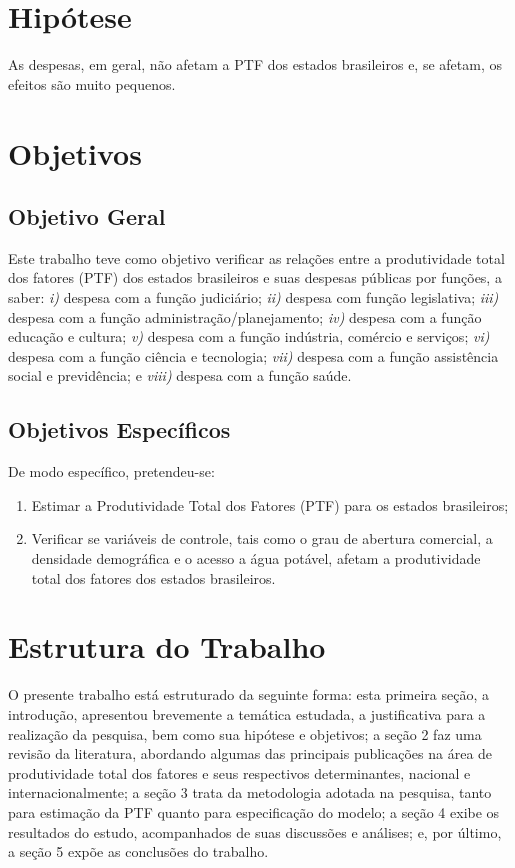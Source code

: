 \documentclass[
  12pt,
  a4paper,
  oneside,
  brazil,
  chapter=TITLE,
  section=TITLE
]{abntex2}
\begin{document}
\section{Hipótese}

As despesas, em geral, não afetam a PTF dos estados brasileiros e, se afetam, os efeitos são muito pequenos.

\section{Objetivos}

\subsection{Objetivo Geral}

Este trabalho teve como objetivo verificar as relações entre a produtividade total dos fatores (PTF) dos estados brasileiros e suas despesas públicas por funções, a saber: \textit{i)} despesa com a função judiciário; \textit{ii)} despesa com função legislativa; \textit{iii)} despesa com a função administração/planejamento; \textit{iv)} despesa com a função educação e cultura; \textit{v)} despesa com a função indústria, comércio e serviços; \textit{vi)} despesa com a função ciência e tecnologia; \textit{vii)} despesa com a função assistência social e previdência; e \textit{viii)} despesa com a função saúde.

\subsection{Objetivos Específicos}

De modo específico, pretendeu-se:

\begin{enumerate}[label=\alph*)]
  \item Estimar a Produtividade Total dos Fatores (PTF) para os estados brasileiros;
  \item Verificar se variáveis de controle, tais como o grau de abertura comercial, a densidade demográfica e o acesso a água potável, afetam a produtividade total dos fatores dos estados brasileiros.
\end{enumerate}

\section{Estrutura do Trabalho}

O presente trabalho está estruturado da seguinte forma: esta primeira seção, a introdução, apresentou brevemente a temática estudada, a justificativa para a realização da pesquisa, bem como sua hipótese e objetivos; a seção 2 faz uma revisão da literatura, abordando algumas das principais publicações na área de produtividade total dos fatores e seus respectivos determinantes, nacional e internacionalmente; a seção 3 trata da metodologia adotada na pesquisa, tanto para estimação da PTF quanto para especificação do modelo; a seção 4 exibe os resultados do estudo, acompanhados de suas discussões e análises; e, por último, a seção 5 expõe as conclusões do trabalho.
\end{document}
